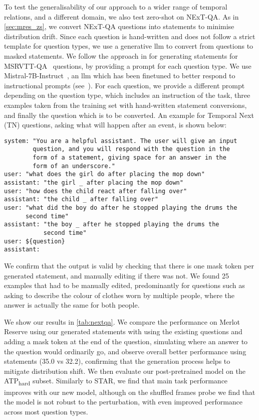 To test the generalisability of our approach to a wider range of temporal
relations, and a different domain, we also test zero-shot on NExT-QA. As in
\cref{sec:mres_zs}, we convert NExT-QA questions into statements to minimise
distribution drift. Since each question is hand-written and does not follow a
strict template for question types, we use a generative \acrshort{llm} to
convert from questions to masked statements. We follow the approach in
\citet{zellers2022mreserve} for generating statements for
MSRVTT-QA~\citep{xu2016msr-vtt} questions, by providing a prompt for each
question type. We use Mistral-7B-Instruct~\cite{jiang2023mistral}, an
\acrshort{llm} which has been finetuned to better respond to instructional
prompts (see~\citet{ouyang2022instructgpt}). For each question, we provide a
different prompt depending on the question type, which includes an instruction
of the task, three examples taken from the training set with hand-written
statement conversions, and finally the question which is to be converted. An
example for Temporal Next (TN) questions, asking what will happen after an
event, is shown below:

\begin{verbatim}
system: "You are a helpful assistant. The user will give an input
        question, and you will respond with the question in the
        form of a statement, giving space for an answer in the
        form of an underscore."
user: "what does the girl do after placing the mop down"
assistant: "the girl _ after placing the mop down"
user: "how does the child react after falling over"
assistant: "the child _ after falling over"
user: "what did the boy do after he stopped playing the drums the 
      second time"
assistant: "the boy _ after he stopped playing the drums the 
           second time"
user: ${question}
assistant: 
\end{verbatim}

We confirm that the output is valid by checking that there is one mask token
per generated statement, and manually editing if there was not. We found 25
examples that had to be manually edited, predominantly for questions such as
asking to describe the colour of clothes worn by multiple people, where the
answer is actually the same for both people.

We show our results in \cref{tab:nextqa}. We compare the performance on Merlot
Reserve using our generated statements with using the existing questions and
adding a mask token at the end of the question, simulating where an answer to
the question would ordinarily go, and observe overall better performance using
statements (35.0 vs 32.2), confirming that the generation process helps to
mitigate distribution shift. We then evaluate our post-pretrained model on the
ATP\textsubscript{hard} subset. Similarly to STAR, we find that main task
performance improves with our new model, although on the shuffled frames probe
we find that the model is not robust to the perturbation, with even improved
performance across most question types.

